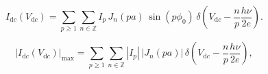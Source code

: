            \begin{equation}
            I_{\mathrm dc}(V_{\mathrm dc})
            =\sum_{p\ge1}\sum_{n\in\mathbb Z}
            I_p\,J_n(pa)\,\sin(p\phi_0)\,
            \delta\!\left(V_{\mathrm dc}-\frac{n}{p}\frac{h\nu}{2e}\right).
            \label{eq:meso:voltagebiased-dc-comb}
            \end{equation}

            \begin{equation}
            |I_{\mathrm dc}(V_{\mathrm dc})|_{\max}
            =\sum_{p\ge1}\sum_{n\in\mathbb Z}
            |I_p|\,|J_n(pa)|\,
            \delta\!\left(V_{\mathrm dc}-\frac{n}{p}\frac{h\nu}{2e}\right),
            \label{eq:meso:voltagebiased-dc-envelope}
            \end{equation}

